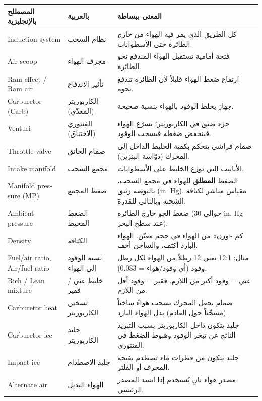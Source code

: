 \documentclass[11pt,a4paper]{article}
\newcommand{\en}[1]{\textenglish{#1}}
\begin{document}
\begin{longtable}{|>{\raggedleft\arraybackslash}p{4.2cm}|>{\raggedleft\arraybackslash}p{3.6cm}|>{\raggedleft\arraybackslash}p{7.2cm}|}
\hline
\textbf{المصطلح بالإنجليزية} & \textbf{بالعربية} & \textbf{المعنى ببساطة}\\\hline\endhead
\en{Induction system} & نظام السحب & كل الطريق الذي يمر فيه الهواء من خارج الطائرة حتى الأسطوانات.\\\hline
\en{Air scoop} & مجرف الهواء & فتحة أمامية تستقبل الهواء المندفع نحو الطائرة.\\\hline
\en{Ram effect / Ram air} & تأثير الاندفاع & ارتفاع ضغط الهواء قليلاً لأن الطائرة تندفع نحوه.\\\hline
\en{Carburetor (Carb)} & الكاربوريتر (المغذّي) & جهاز يخلط الوقود بالهواء بنسبة صحيحة.\\\hline
\en{Venturi} & الفنتوري (الاختناق) & جزء ضيق في الكاربوريتر؛ يسرّع الهواء فينخفض ضغطه فيسحب الوقود.\\\hline
\en{Throttle valve} & صمام الخانق & صمام فراشي يتحكم بكمية الخليط الداخل إلى المحرك (دوّاسة البنزين).\\\hline
\en{Intake manifold} & مجمع السحب & الأنابيب التي توزع الخليط على الأسطوانات.\\\hline
\en{Manifold pressure (MP)} & ضغط المجمع & الضغط \textbf{المطلق} للهواء في مجمع السحب، بالبوصة زئبق (\en{in. Hg}). مقياس مباشر لكثافة الشحنة وبالتالي للقدرة.\\\hline
\en{Ambient pressure} & الضغط المحيط & ضغط الجو خارج الطائرة (حوالي 30 \en{in. Hg} عند سطح البحر).\\\hline
\en{Density} & الكثافة & كم «وزن» من الهواء في حجم معيّن. الهواء البارد أكثف، والساخن أخف.\\\hline
\en{Fuel/air ratio, Air/fuel ratio} & نسبة الوقود إلى الهواء & مثال: 12:1 تعني 12 رطلاً من الهواء لكل رطل وقود (أي وقود/هواء = 0.083).\\\hline
\en{Rich / Lean mixture} & خليط غني / فقير & غني = وقود أكثر من اللازم. فقير = وقود أقل من اللازم.\\\hline
\en{Carburetor heat} & تسخين الكاربوريتر & صمام يجعل المحرك يسحب هواءً ساخناً (مسخّناً حول العادم) بدل الهواء البارد.\\\hline
\en{Carburetor ice} & جليد الكاربوريتر & جليد يتكون داخل الكاربوريتر بسبب التبريد الناتج عن تبخر الوقود وهبوط الضغط في الفنتوري.\\\hline
\en{Impact ice} & جليد الاصطدام & جليد يتكون من قطرات ماء تصطدم بفتحة المجرف أو الفلتر.\\\hline
\en{Alternate air} & الهواء البديل & مصدر هواء ثانٍ يُستخدم إذا انسد المصدر الرئيسي.\\\hline

\end{longtable}
\end{document}
